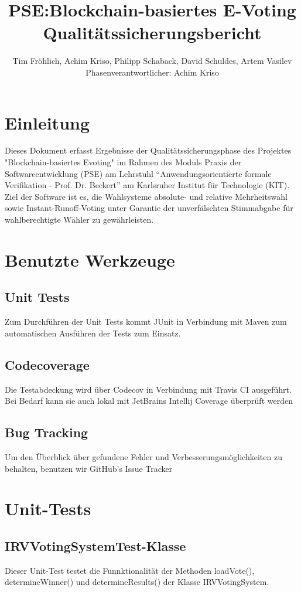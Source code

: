 \documentclass[parskip=full]{scrartcl}
\title{
	PSE:Blockchain-basiertes E-Voting \\
	Qualitätssicherungsbericht
}
\author{Tim Fröhlich, Achim Kriso, Philipp Schaback, David Schuldes, Artem Vasilev\\ Phasenverantwortlicher: Achim Kriso}
\begin{document}
\clearpage
\maketitle
{}
\newpage

\tableofcontents
\newpage
{}

\section{Einleitung}
Dieses Dokument erfasst Ergebnisse der Qualitätssicherungsphase des Projektes "Blockchain-basiertes Evoting" im Rahmen des Moduls Praxis der Softwareentwicklung (PSE) am Lehrstuhl \enquote{Anwendungsorientierte formale Verifikation - Prof. Dr. Beckert} am Karlsruher Institut für Technologie (KIT).\\
Ziel der Software ist es, die Wahlsysteme absolute- und relative Mehrheitswahl sowie Instant-Runoff-Voting unter Garantie der unverfälschten Stimmabgabe für wahlberechtigte Wähler zu gewährleisten.

\section{Benutzte Werkzeuge}
\subsection{Unit Tests}
Zum Durchführen der Unit Tests kommt JUnit in Verbindung mit Maven zum automatischen Ausführen der Tests zum Einsatz. 
\subsection{Codecoverage}
Die Testabdeckung wird über Codecov in Verbindung mit Travis CI ausgeführt. Bei Bedarf kann sie auch lokal mit JetBrains Intellij Coverage überprüft werden
\subsection{Bug Tracking}
Um den Überblick über gefundene Fehler und Verbesserungsmöglichkeiten zu behalten, benutzen wir GitHub's Issue Tracker

\section{Unit-Tests} %
\subsection{IRVVotingSystemTest-Klasse}  
Dieser Unit-Test testet die Funnktionalität der Methoden loadVote(), determineWinner() und determineResults() der Klasse IRVVotingSystem. 
\end{document}
